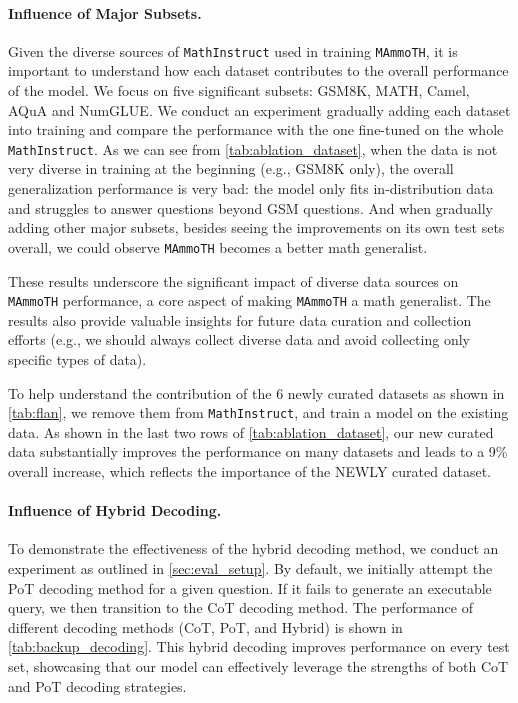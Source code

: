 \paragraph{Influence of Major Subsets.} Given the diverse sources of \texttt{MathInstruct} used in training \texttt{MAmmoTH}, it is important to understand how each dataset contributes to the overall performance of the model. We focus on five significant subsets: GSM8K, MATH, Camel, AQuA and NumGLUE. We conduct an experiment gradually adding each dataset into training and compare the performance with the one fine-tuned on the whole \texttt{MathInstruct}. As we can see from \autoref{tab:ablation_dataset}, when the data is not very diverse in training at the beginning (e.g., GSM8K only), the overall generalization performance is very bad: the model only fits in-distribution data and struggles to answer questions beyond GSM questions. And when gradually adding other major subsets, besides seeing the improvements on its own test sets overall, we could observe \texttt{MAmmoTH} becomes a better math generalist. 

These results underscore the significant impact of diverse data sources on \texttt{MAmmoTH} performance, a core aspect of making \texttt{MAmmoTH} a math generalist. The results also provide valuable insights for future data curation and collection efforts (e.g., we should always collect diverse data and avoid collecting only specific types of data).

To help understand the contribution of the 6 newly curated datasets as shown in \autoref{tab:flan}, we remove them from \texttt{MathInstruct}, and train a model on the existing data. As shown in the last two rows of \autoref{tab:ablation_dataset}, our new curated data substantially improves the performance on many datasets and leads to a 9\% overall increase, which reflects the importance of the NEWLY curated dataset.

\label{exp:backup_decoding}
\paragraph{Influence of Hybrid Decoding.} To demonstrate the effectiveness of the hybrid decoding method, we conduct an experiment as outlined in \autoref{sec:eval_setup}. By default, we initially attempt the PoT decoding method for a given question. If it fails to generate an executable query, we then transition to the CoT decoding method. The performance of different decoding methods (CoT, PoT, and Hybrid) is shown in \autoref{tab:backup_decoding}. This hybrid decoding improves performance on every test set, showcasing that our model can effectively leverage the strengths of both CoT and PoT decoding strategies.

